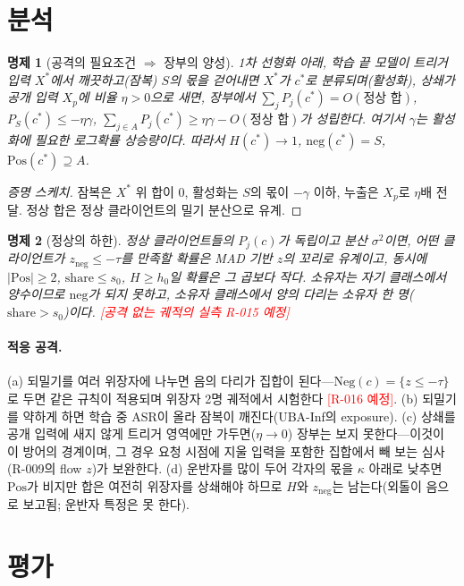 \documentclass[10pt,a4paper]{article}
\newcommand{\todo}[1]{\textcolor{red}{[#1]}}
\newtheorem{proposition}{명제}
\begin{document}
\section{분석}\label{sec:analysis}
\begin{proposition}[공격의 필요조건 $\Rightarrow$ 장부의 양성]
1차 선형화 아래, 학습 끝 모델이 트리거 입력 $X^*$에서 깨끗하고(잠복) $S$의 몫을 걷어내면 $X^*$가 $c^*$로 분류되며(활성화), 상쇄가 공개 입력 $X_p$에 비율 $\eta>0$으로 새면, 장부에서 $\sum_jP_j(c^*)=O(\text{정상 합})$, $P_S(c^*)\le-\eta\gamma$, $\sum_{j\in A}P_j(c^*)\ge\eta\gamma-O(\text{정상 합})$가 성립한다. 여기서 $\gamma$는 활성화에 필요한 로그확률 상승량이다. 따라서 $H(c^*)\to1$, $\mathrm{neg}(c^*)=S$, $\mathrm{Pos}(c^*)\supseteq A$.
\end{proposition}
\begin{proof}[증명 스케치] 잠복은 $X^*$ 위 합이 0, 활성화는 $S$의 몫이 $-\gamma$ 이하, 누출은 $X_p$로 $\eta$배 전달. 정상 합은 정상 클라이언트의 밀기 분산으로 유계. \end{proof}
\begin{proposition}[정상의 하한]
정상 클라이언트들의 $P_j(c)$가 독립이고 분산 $\sigma^2$이면, 어떤 클라이언트가 $z_{\mathrm{neg}}\le-\tau$를 만족할 확률은 MAD 기반 $z$의 꼬리로 유계이고, 동시에 $|\mathrm{Pos}|\ge2$, $\mathrm{share}\le s_0$, $H\ge h_0$일 확률은 그 곱보다 작다. 소유자는 자기 클래스에서 양수이므로 $\mathrm{neg}$가 되지 못하고, 소유자 클래스에서 양의 다리는 소유자 한 명($\mathrm{share}>s_0$)이다. \todo{공격 없는 궤적의 실측 R-015 예정}
\end{proposition}
\paragraph{적응 공격.} (a) 되밀기를 여러 위장자에 나누면 음의 다리가 집합이 된다---$\mathrm{Neg}(c)=\{z\le-\tau\}$로 두면 같은 규칙이 적용되며 위장자 2명 궤적에서 시험한다 \todo{R-016 예정}. (b) 되밀기를 약하게 하면 학습 중 ASR이 올라 잠복이 깨진다(UBA-Inf의 exposure). (c) 상쇄를 공개 입력에 새지 않게 트리거 영역에만 가두면($\eta\to0$) 장부는 보지 못한다---이것이 이 방어의 경계이며, 그 경우 요청 시점에 지울 입력을 포함한 집합에서 빼 보는 심사(R-009의 flow $z$)가 보완한다. (d) 운반자를 많이 두어 각자의 몫을 $\kappa$ 아래로 낮추면 $\mathrm{Pos}$가 비지만 합은 여전히 위장자를 상쇄해야 하므로 $H$와 $z_{\mathrm{neg}}$는 남는다(외톨이 음으로 보고됨; 운반자 특정은 못 한다).

\section{평가}\label{sec:eval}
\end{document}
